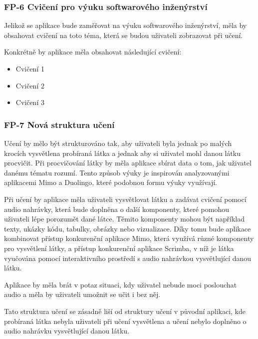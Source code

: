 \subsubsection{FP-6 Cvičení pro výuku softwarového inženýrství}

Jelikož se aplikace bude zaměřovat na výuku softwarového inženýrství, měla by obsahovat cvičení na toto téma, která se budou uživateli zobrazovat při učení.

Konkrétně by aplikace měla obsahovat následující cvičení:

\begin{itemize}
    \item Cvičení 1
    \item Cvičení 2
    \item Cvičení 3
\end{itemize}

\subsubsection{FP-7 Nová struktura učení}

Učení by mělo být strukturováno tak, aby uživateli byla jednak po malých krocích vysvětlena probíraná látka a jednak aby si uživatel mohl danou látku procvičit. Při procvičování látky by měla aplikace sbírat data o tom, jak uživatel danému tématu rozumí. Tento způsob výuky je inspirován analyzovanými aplikacemi Mimo a Duolingo, které podobnou formu výuky využívají.

Při učení by aplikace měla uživateli vysvětlovat látku a zadávat cvičení pomocí audio nahrávky, která bude doplněna o další komponenty, které pomohou uživateli lépe porozumět dané látce. Těmito komponenty mohou být například texty, ukázky kódu, tabulky, obrázky nebo vizualizace. Díky tomu bude aplikace kombinovat přístup konkurenční aplikace Mimo, která využívá různé komponenty pro vysvětlení látky, a přístup konkurenční aplikace Scrimba, v níž je látka vyučována pomocí interaktivního prostředí s audio nahrávkou vysvětlující danou látku.

Aplikace by měla brát v potaz situaci, kdy uživatel nebude moci poslouchat audio a měla by uživateli umožnit se učit i bez něj.

Tato struktura učení se zásadně liší od struktury učení v původní aplikaci, kde probíraná látka nebyla uživateli při učení vysvětlena a učení nebylo doplněno o audio nahrávku vysvětlující danou látku.

